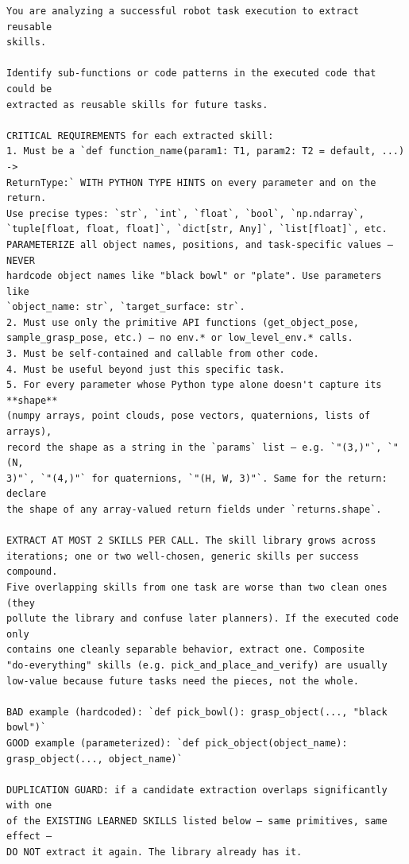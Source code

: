 \begin{lstlisting}[style=ratsappendixprompt]
You are analyzing a successful robot task execution to extract reusable
skills.

Identify sub-functions or code patterns in the executed code that could be
extracted as reusable skills for future tasks.

CRITICAL REQUIREMENTS for each extracted skill:
1. Must be a `def function_name(param1: T1, param2: T2 = default, ...) ->
ReturnType:` WITH PYTHON TYPE HINTS on every parameter and on the return.
Use precise types: `str`, `int`, `float`, `bool`, `np.ndarray`,
`tuple[float, float, float]`, `dict[str, Any]`, `list[float]`, etc.
PARAMETERIZE all object names, positions, and task-specific values — NEVER
hardcode object names like "black bowl" or "plate". Use parameters like
`object_name: str`, `target_surface: str`.
2. Must use only the primitive API functions (get_object_pose,
sample_grasp_pose, etc.) — no env.* or low_level_env.* calls.
3. Must be self-contained and callable from other code.
4. Must be useful beyond just this specific task.
5. For every parameter whose Python type alone doesn't capture its **shape**
(numpy arrays, point clouds, pose vectors, quaternions, lists of arrays),
record the shape as a string in the `params` list — e.g. `"(3,)"`, `"(N,
3)"`, `"(4,)"` for quaternions, `"(H, W, 3)"`. Same for the return: declare
the shape of any array-valued return fields under `returns.shape`.

EXTRACT AT MOST 2 SKILLS PER CALL. The skill library grows across
iterations; one or two well-chosen, generic skills per success compound.
Five overlapping skills from one task are worse than two clean ones (they
pollute the library and confuse later planners). If the executed code only
contains one cleanly separable behavior, extract one. Composite
"do-everything" skills (e.g. pick_and_place_and_verify) are usually
low-value because future tasks need the pieces, not the whole.

BAD example (hardcoded): `def pick_bowl(): grasp_object(..., "black bowl")`
GOOD example (parameterized): `def pick_object(object_name):
grasp_object(..., object_name)`

DUPLICATION GUARD: if a candidate extraction overlaps significantly with one
of the EXISTING LEARNED SKILLS listed below — same primitives, same effect —
DO NOT extract it again. The library already has it.


\end{lstlisting}
